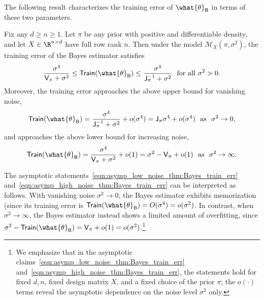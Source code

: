 \documentclass[11pt]{article}
\newcommand{\bysest}{\what{\theta}_{\mathsf{B}}}
\newcommand{\trerr}{\mathsf{Train}}
\newcommand{\model}{\mathscr{M}}
\newcommand{\jfunc}{\mathsf{J}}
\begin{document}
The following result characterizes the training error of $\bysest$ in terms of these two parameters.
\begin{theorem}\label{thm:Bayes_train_err}
Fix any $d\geq n\geq 1$. Let $\pi$ be any prior with positive and differentiable density, and let $X\in\R^{n\times d}$ have full row rank $n$. Then under the model $\model_X(\pi,\sigma^2)$, the training error of the Bayes estimator satisfies
    \begin{equation}\label{eqn:sandwich_ineq_thm:Bayes_train_err}\frac{\sigma^4}{\mathsf{V}_{\pi} + \sigma^2} \leq \trerr(\bysest) \leq  \frac{\sigma^4}{\jfunc_{\pi}^{-1} + \sigma^2}\textnormal{ \ for all $\sigma^2>0$}.\end{equation}
Moreover, the training error approaches the above upper bound for vanishing noise,
\begin{equation}\label{eqn:asymp_low_noise_thm:Bayes_train_err}\trerr(\bysest) = \frac{\sigma^4}{\jfunc_{\pi}^{-1} + \sigma^2} + o(\sigma^4) = \jfunc_{\pi}\sigma^4  + o(\sigma^4) \textnormal{ \ as \ }\sigma^2 \to 0,\end{equation}
and approaches the above lower bound for increasing noise,
\begin{equation}\label{eqn:asymp_high_noise_thm:Bayes_train_err}\trerr(\bysest) = \frac{\sigma^4}{\mathsf{V}_{\pi} + \sigma^2} + o(1) = \sigma^2 - \mathsf{V}_{\pi} + o(1) \textnormal{ \ as \ }\sigma^2 \to \infty.\end{equation}
\end{theorem}
\noindent The asymptotic statements~\eqref{eqn:asymp_low_noise_thm:Bayes_train_err} and~\eqref{eqn:asymp_high_noise_thm:Bayes_train_err} can be interpreted as follows. With vanishing noise $\sigma^2\to 0$, the Bayes estimator exhibits memorization (since its training error is $\trerr(\bysest) = O(\sigma^4) = o(\sigma^2)$. In contrast, when $\sigma^2\to\infty$, the Bayes estimator instead shows a limited amount of overfitting, since $\sigma^2 - \trerr(\bysest) = \mathsf{V}_\pi + o(1) = o(\sigma^2)$.\footnote{We emphasize that in the asymptotic claims~\eqref{eqn:asymp_low_noise_thm:Bayes_train_err} and~\eqref{eqn:asymp_high_noise_thm:Bayes_train_err}, the statements hold for fixed $d,n$, fixed design matrix $X$, and a fixed choice of the prior $\pi$; the $o(\cdot)$ terms reveal the asymptotic dependence on the noise level $\sigma^2$ only.}
\end{document}
